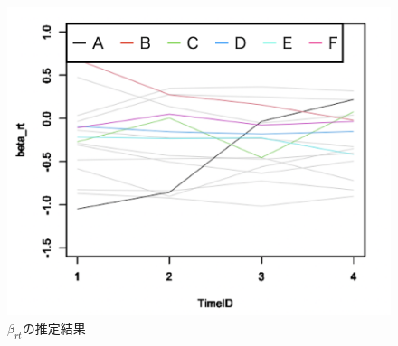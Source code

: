 \documentclass[a4paper,11pt,oneside,openany]{jsbook}
\begin{document}
\begin{figure}[tb]
  \begin{center}
  \includegraphics[keepaspectratio, scale=0.5]{img/data_img2.png}
 \caption{$\beta_{rt}$の推定結果}\label{beta_rt_data_img}
\end{center}
\end{figure}
\end{document}
